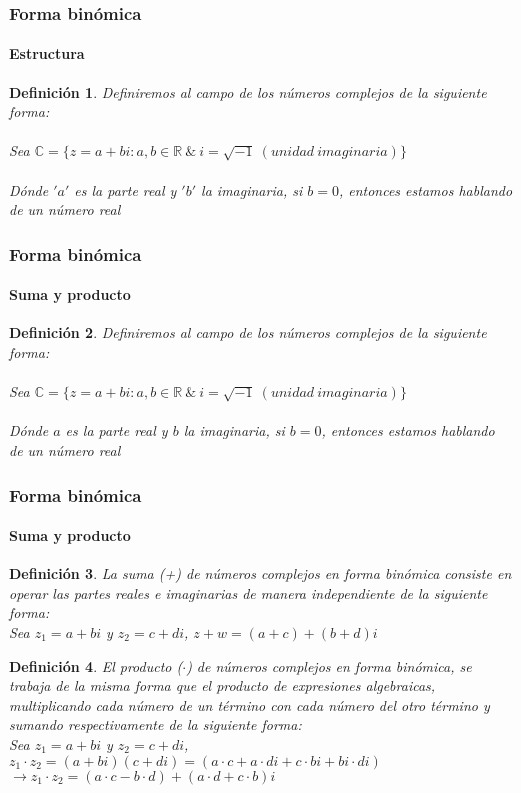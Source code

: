 \documentclass[11pt]{beamer}
\newtheorem{defi}{Definición}
\begin{document}
\begin{frame}
\frametitle{Forma binómica}
\framesubtitle{Estructura}
\begin{defi}
Definiremos al campo de los números complejos de la siguiente forma:\\ \hspace{0cm} \\
Sea $\mathbb{C} = \{z = a + bi : a,b\in \mathbb{R}~\&~i = \sqrt{-1}~(unidad~imaginaria)\}$\\ \hspace{0cm} \\
Dónde $'a'$ es la parte real y $'b'$ la imaginaria, si $b=0$, entonces estamos hablando de un número real
\end{defi}
\end{frame}

\begin{frame}
\frametitle{Forma binómica}
\framesubtitle{Suma y producto}
\begin{defi}
Definiremos al campo de los números complejos de la siguiente forma:\\ \hspace{0cm} \\
Sea $\mathbb{C} = \{z = a + bi : a,b\in \mathbb{R}~\&~i = \sqrt{-1}~(unidad~imaginaria)\}$\\ \hspace{0cm} \\
Dónde $a$ es la parte real y $b$ la imaginaria, si $b=0$, entonces estamos hablando de un número real
\end{defi}
\end{frame}

\begin{frame}
\frametitle{Forma binómica}
\framesubtitle{Suma y producto}
\begin{defi}
La suma (+) de números complejos en forma binómica consiste en operar las partes reales e imaginarias de manera independiente de la siguiente forma: \\
Sea $z_1 = a + bi$ y $z_2 = c + di$, $z + w = (a + c)+(b + d)i$
\end{defi}
\begin{defi}
El producto ($\cdot$) de números complejos en forma binómica, se trabaja de la misma forma que el producto de expresiones algebraicas, multiplicando cada número de un término con cada número del otro término y sumando respectivamente de la siguiente forma:\\ 
Sea $z_1 = a + bi$ y $z_2 = c + di$, $z_1 \cdot z_2 = (a+bi)(c+di) = (a\cdot c + a\cdot di + c\cdot bi + bi\cdot di)$\\
$\rightarrow z_1\cdot z_2 = (a\cdot c - b\cdot d) + (a\cdot d + c\cdot b)i$
\end{defi}
\end{frame}
\end{document}

